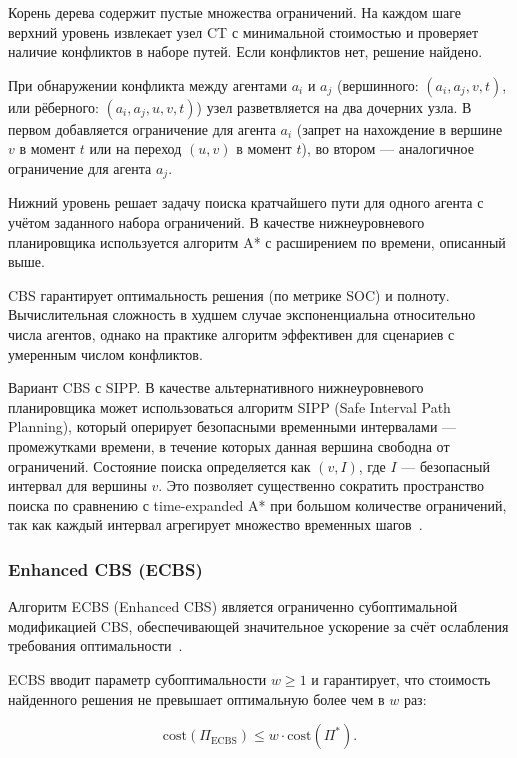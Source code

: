 Корень дерева содержит пустые множества ограничений. На каждом шаге верхний уровень извлекает узел CT с минимальной стоимостью и проверяет наличие конфликтов в наборе путей. Если конфликтов нет, решение найдено.

При обнаружении конфликта между агентами $a_i$ и $a_j$ (вершинного: $(a_i, a_j, v, t)$, или рёберного: $(a_i, a_j, u, v, t)$) узел разветвляется на два дочерних узла. В первом добавляется ограничение для агента $a_i$ (запрет на нахождение в вершине $v$ в момент $t$ или на переход $(u, v)$ в момент $t$), во втором --- аналогичное ограничение для агента $a_j$.

Нижний уровень решает задачу поиска кратчайшего пути для одного агента с учётом заданного набора ограничений. В качестве нижнеуровневого планировщика используется алгоритм A* с расширением по времени, описанный выше.

CBS гарантирует оптимальность решения (по метрике SOC) и полноту. Вычислительная сложность в худшем случае экспоненциальна относительно числа агентов, однако на практике алгоритм эффективен для сценариев с умеренным числом конфликтов.

Вариант CBS с SIPP. В качестве альтернативного нижнеуровневого планировщика может использоваться алгоритм SIPP (Safe Interval Path Planning), который оперирует безопасными временными интервалами --- промежутками времени, в течение которых данная вершина свободна от ограничений. Состояние поиска определяется как $(v, I)$, где $I$ --- безопасный интервал для вершины $v$. Это позволяет существенно сократить пространство поиска по сравнению с time-expanded A* при большом количестве ограничений, так как каждый интервал агрегирует множество временных шагов~\cite{phillips2011sipp}.

\subsubsection{Enhanced CBS (ECBS)}

Алгоритм ECBS (Enhanced CBS) является ограниченно субоптимальной модификацией CBS, обеспечивающей значительное ускорение за счёт ослабления требования оптимальности~\cite{barer2014ecbs}.

ECBS вводит параметр субоптимальности $w \geq 1$ и гарантирует, что стоимость найденного решения не превышает оптимальную более чем в $w$ раз:

\begin{equation}
    \label{eq:ecbs_bound}
    \text{cost}(\Pi_{\text{ECBS}}) \leq w \cdot \text{cost}(\Pi^*).
\end{equation}

